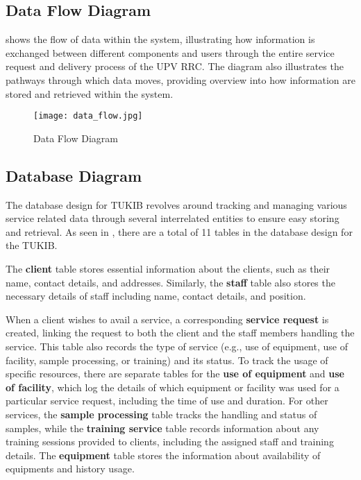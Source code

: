 \newpage

\subsection{Data Flow Diagram}

 shows the flow of data within the system, illustrating how information is exchanged between different components and users through the entire service request and delivery process of the UPV RRC. The diagram also illustrates the pathways through which data moves, providing overview into how information are stored and retrieved within the system.

\begin{figure}[h]
	\centering 
	\texttt{[image: data\_flow.jpg]}
	\caption{Data Flow Diagram}
	\label{fig:data_flow}
\end{figure}

\subsection{Database Diagram}

The database design for TUKIB revolves around tracking and managing various service related data through several interrelated entities to ensure easy storing and retrieval. As seen in , there are a total of 11 tables in the database design for the TUKIB. 

The \textbf{client} table stores essential information about the clients, such as their name, contact details, and addresses. Similarly, the \textbf{staff} table also stores the necessary details of staff including name, contact details, and position. 

When a client wishes to avail a service, a corresponding \textbf{service request} is created, linking the request to both the client and the staff members handling the service. This table also records the type of service (e.g., use of equipment, use of facility, sample processing, or training) and its status. To track the usage of specific resources, there are separate tables for the \textbf{use of equipment} and \textbf{use of facility}, which log the details of which equipment or facility was used for a particular service request, including the time of use and duration. For other services, the \textbf{sample processing} table tracks the handling and status of samples, while the \textbf{training service} table records information about any training sessions provided to clients, including the assigned staff and training details. The \textbf{equipment} table stores the information about availability of equipments and history usage. 


